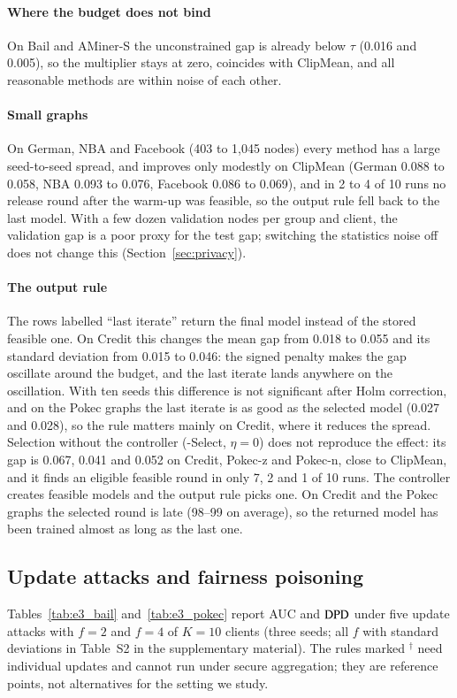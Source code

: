 \paragraph{Where the budget does not bind}
On Bail and AMiner-S the unconstrained gap is already below $\tau$ (0.016 and 0.005), so the multiplier stays at zero, \clamp{} coincides with ClipMean, and all reasonable methods are within noise of each other.

\paragraph{Small graphs}
On German, NBA and Facebook (403 to 1{,}045 nodes) every method has a large seed-to-seed spread, and \clamp{} improves only modestly on ClipMean (German 0.088 to 0.058, NBA 0.093 to 0.076, Facebook 0.086 to 0.069), and in 2 to 4 of 10 runs no release round after the warm-up was feasible, so the output rule fell back to the last model. With a few dozen validation nodes per group and client, the validation gap is a poor proxy for the test gap; switching the statistics noise off does not change this (Section~\ref{sec:privacy}).

\paragraph{The output rule}
The rows labelled ``last iterate'' return the final model instead of the stored feasible one. On Credit this changes the mean gap from 0.018 to 0.055 and its standard deviation from 0.015 to 0.046: the signed penalty makes the gap oscillate around the budget, and the last iterate lands anywhere on the oscillation. With ten seeds this difference is not significant after Holm correction, and on the Pokec graphs the last iterate is as good as the selected model (0.027 and 0.028), so the rule matters mainly on Credit, where it reduces the spread. Selection without the controller (\clamp{}-Select, $\eta=0$) does not reproduce the effect: its gap is 0.067, 0.041 and 0.052 on Credit, Pokec-z and Pokec-n, close to ClipMean, and it finds an eligible feasible round in only 7, 2 and 1 of 10 runs. The controller creates feasible models and the output rule picks one. On Credit and the Pokec graphs the selected round is late (98--99 on average), so the returned model has been trained almost as long as the last one.

\subsection{Update attacks and fairness poisoning}\label{sec:byz}


Tables~\ref{tab:e3_bail} and~\ref{tab:e3_pokec} report AUC and $\mathrm{DPD}$ under five update attacks with $f=2$ and $f=4$ of $K=10$ clients (three seeds; all $f$ with standard deviations in Table~S2 in the supplementary material). The rules marked $^\dagger$ need individual updates and cannot run under secure aggregation; they are reference points, not alternatives for the setting we study.

